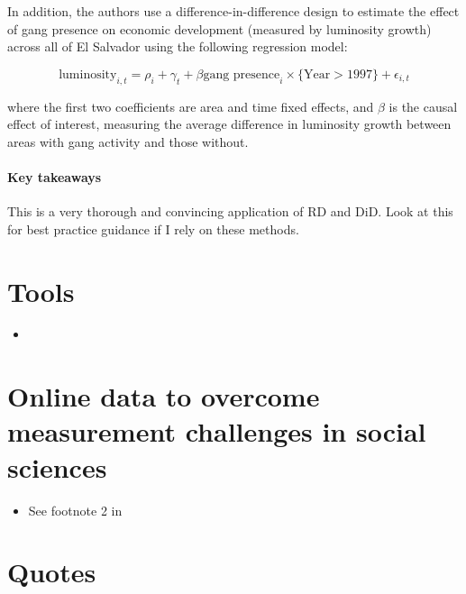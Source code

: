 \documentclass[a4paper, 11pt]{report}
\begin{document}
In addition, the authors use a difference-in-difference design to estimate the effect of gang presence on economic development (measured by luminosity growth) across all of El Salvador using the following regression model:

\begin{equation}
	\text{luminosity}_{i,t} = \rho_i + \gamma_t + \beta \text{gang presence}_i \times \{\text{Year} > 1997\}+ \epsilon_{i,t}
\end{equation}

where the first two coefficients are area and time fixed effects, and $\beta$ is the causal effect of interest, measuring the average difference in luminosity growth between areas with gang activity and those without.

\paragraph{Key takeaways}
This is a very thorough and convincing application of RD and DiD. Look at this for best practice guidance if I rely on these methods.

\section{Tools}

\begin{itemize}
	\item \citet{scikit-learn}
\end{itemize}

\section{Online data to overcome measurement challenges in social sciences}
\begin{itemize}
	\item See footnote 2 in \citet{kuchler2018sticking}
\end{itemize}


\section{Quotes}
\end{document}
